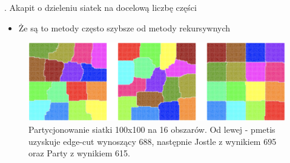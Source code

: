 . Akapit o dzieleniu siatek na docelową liczbę części
\begin{itemize}
    \item {Że są to metody często szybsze od metody rekursywnych\cite{KARYPIS199896}}
\end{itemize}

\begin{figure}
    \vspace{-4mm}
    \includegraphics[width=\linewidth]{images/libraries-comparision}
    \caption{Partycjonowanie siatki 100x100 na 16 obszarów. Od lewej - pmetis\cite{metis} uzyskuje edge-cut wynoszący
    688, następnie Jostle\cite{jostle} z wynikiem 695 oraz Party\cite{1364754} z wynikiem 615.}
    \label{fig:test2}
\end{figure}

\lipsum

